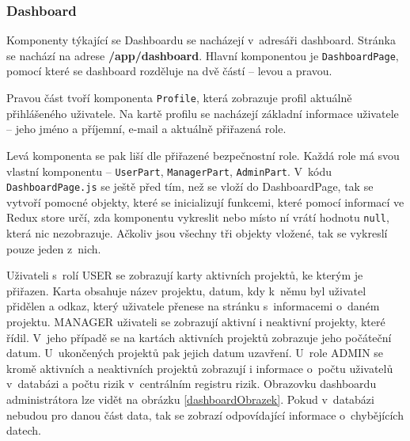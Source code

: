  


\subsubsection *{Dashboard}

Komponenty týkající se Dashboardu se nacházejí v~adresáři dashboard. Stránka se nachází na adrese \textbf{/app/dashboard}. Hlavní komponentou je \texttt{DashboardPage}, pomocí které se dashboard rozděluje na dvě částí – levou a pravou. 

Pravou část tvoří komponenta \texttt{Profile}, která zobrazuje profil aktuálně přihlášeného uživatele. Na kartě profilu se nacházejí základní informace uživatele – jeho jméno a příjemní, e-mail a aktuálně přiřazená role. 

Levá komponenta se pak liší dle přiřazené bezpečnostní role. Každá role má svou vlastní komponentu – \texttt{UserPart}, \texttt{ManagerPart}, \texttt{AdminPart}. V~kódu \texttt{DashboardPage.js} se ještě před tím, než se vloží do DashboardPage, tak se vytvoří pomocné objekty, které se inicializují funkcemi, které pomocí informací ve Redux store určí, zda komponentu vykreslit nebo místo ní vrátí hodnotu \texttt{null}, která nic nezobrazuje. Ačkoliv jsou všechny tři objekty vložené, tak se vykreslí pouze jeden z~nich. 

Uživateli s~rolí USER se zobrazují karty aktivních projektů, ke kterým je přiřazen. Karta obsahuje název projektu, datum, kdy k~němu byl uživatel přidělen a odkaz, který uživatele přenese na stránku s~informacemi o~daném projektu. MANAGER uživateli se zobrazují aktivní i neaktivní projekty, které řídil. V~jeho případě se na kartách aktivních projektů zobrazuje jeho počáteční datum. U~ukončených projektů pak jejich datum uzavření. U~role ADMIN se kromě aktivních a neaktivních projektů zobrazují i informace o~počtu uživatelů v~databázi a počtu rizik v~centrálním registru rizik. Obrazovku dashboardu administrátora lze vidět na obrázku \ref{dashboardObrazek}. Pokud v~databázi nebudou pro danou část data, tak se zobrazí odpovídající informace o~chybějících datech.

